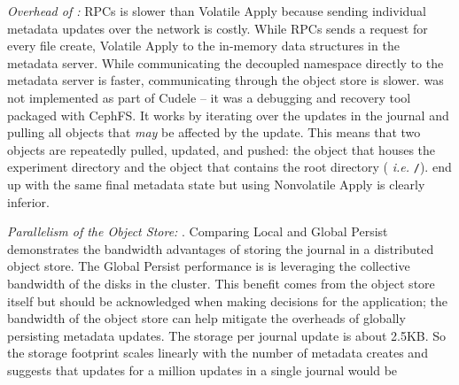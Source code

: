 {\it Overhead of :} RPCs is
\oldcomment{\(66\times\)}\newcomment{\(19.9\times\)} slower than Volatile Apply
because sending individual metadata updates over the network is costly.  While
RPCs sends a request for every file create, Volatile Apply  to the in-memory data structures in the metadata server. While
communicating the decoupled namespace directly to the metadata server
 is faster, communicating through the object
store  is
\oldcomment{\(10\times\)}\newcomment{\(78\times\)} slower.  
was not implemented as part of Cudele -- it was a debugging and recovery tool
packaged with CephFS. It works by iterating over the updates in the journal and
pulling all objects that {\it may} be affected by the update.  This means that
two objects are repeatedly pulled, updated, and pushed: the object that houses
the experiment directory and the object that contains the root directory ({\it
i.e.} \texttt{/}).   
end up with the same final metadata state but using Nonvolatile Apply is
clearly inferior.

{\it Parallelism of the Object Store:}
.  Comparing Local and
Global Persist demonstrates the bandwidth advantages of storing the journal in
a distributed object store. The Global Persist performance is  is
leveraging the collective bandwidth of the disks in the cluster. This benefit
comes from the object store itself but should be acknowledged when making
decisions for the application; the bandwidth of the object store can help
mitigate the overheads of globally persisting metadata updates. The storage per
journal update is about 2.5KB. So the storage footprint scales linearly with
the number of metadata creates and suggests that updates for a million updates
in a single journal would be 

